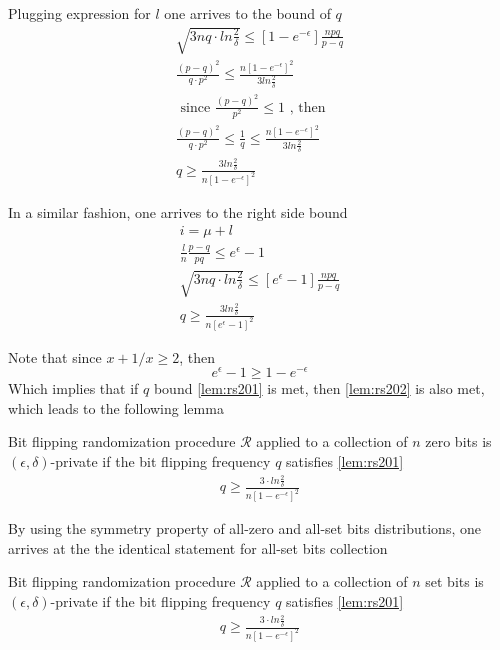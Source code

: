 \documentclass[11pt]{article}
\newcommand{\cR}{\mathcal{R}}
\begin{document}
Plugging expression for $l$ one arrives to the bound of $q$
\begin{align}
\sqrt{3nq \cdot ln\frac{2}{\delta}} \le \left [ 1 - e^{-\epsilon}\right ] \frac { npq}{p - q} \\
 \frac {(p - q)^2} {q \cdot p^2} \le   \frac { n \left [ 1 - e^{-\epsilon}\right ]^2 } { 3  ln\frac{2}{\delta}}  \\
 \text{ since }  \frac {(p - q)^2} { p^2} \le 1 \text{ , then }  \\
  \frac {(p - q)^2} {q \cdot p^2} \le \frac{1}{q}  \le   \frac { n \left [ 1 - e^{-\epsilon}\right ]^2 } { 3  ln\frac{2}{\delta}}  \\
  q \ge  \frac { 3  ln\frac{2}{\delta}} { n \left [ 1 - e^{-\epsilon}\right ]^2 } \label{lem:rs201}
\end{align}

In a similar fashion, one arrives to the right side bound
\begin{align}
i = \mu + l \\
\frac{l}{n} \frac{p-q}{pq}  \le e^\epsilon - 1 \\
\sqrt{3nq \cdot ln\frac{2}{\delta}} \le \left [ e^\epsilon - 1  \right ] \frac { npq}{p - q} \\
  q \ge  \frac { 3  ln\frac{2}{\delta}} { n \left [ e^{\epsilon} - 1\right ]^2 }  \label{lem:rs202}
\end{align}

Note that since $x + 1/x \ge 2$, then 
\[ e^{\epsilon} - 1 \ge 1 - e^{-\epsilon} \]
Which implies that if $q$ bound  \eqref{lem:rs201} is met, then \eqref{lem:rs202} is also met, which leads to the following lemma

 \begin{lem} \label{lem:rs203}
 Bit flipping randomization procedure $\cR$ applied to a collection of $n$ zero bits is $(\epsilon, \delta)$-private if the bit flipping frequency $q$ satisfies \eqref{lem:rs201}
 \begin{align*}
  q \ge  \frac { 3 \cdot ln\frac{2}{\delta}} { n \left [ 1 - e^{-\epsilon}\right ]^2 }\end{align*}
\end{lem}

By using the symmetry property of all-zero and all-set bits distributions, one arrives at the the identical statement for all-set bits collection
 \begin{lem} \label{lem:rs204}
 Bit flipping randomization procedure $\cR$ applied to a collection of $n$ set bits is $(\epsilon, \delta)$-private if the bit flipping frequency $q$ satisfies \eqref{lem:rs201}
 \begin{align*}
  q \ge  \frac { 3 \cdot ln\frac{2}{\delta}} { n \left [ 1 - e^{-\epsilon}\right ]^2 }
\end{align*}
\end{lem}
\end{document}
